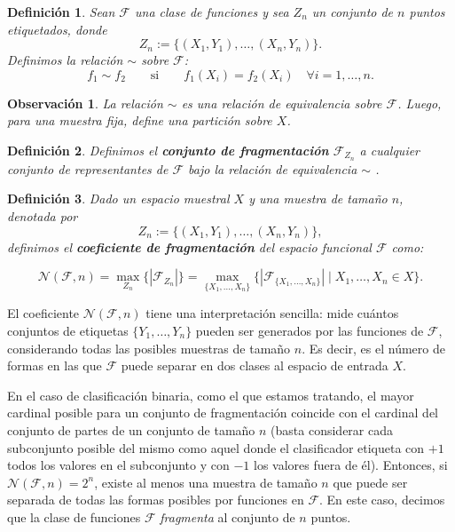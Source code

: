 \documentclass{report}
\newtheorem{dfn}{Definición}[section]
\newtheorem{obs}{Observación}[section]
\begin{document}
\begin{dfn}
    Sean \(\mathcal{F}\) una clase de funciones y sea \(Z_n\) un conjunto de \(n\) puntos etiquetados, donde
    \[
    Z_n := \{(X_1, Y_1), \dots, (X_n, Y_n)\}.
    \]
    Definimos la relación \(\sim\) sobre \(\mathcal{F}\):
    \[
    f_1 \sim f_2 \qquad \text{si} \qquad f_1(X_i) = f_2(X_i) \quad \forall i = 1, \dots, n.
    \]
\end{dfn}
\begin{obs}
    La relación \(\sim\) es una relación de equivalencia sobre \(\mathcal{F}\). Luego, para una muestra fija,
    define una partición sobre $X$.
\end{obs}
\begin{dfn}
    Definimos el \textbf{conjunto de fragmentación} \(\mathcal{F}_{Z_n}\) a cualquier conjunto de representantes de \(\mathcal{F}\)
    bajo la relación de equivalencia \(\sim\) .
\end{dfn}
\begin{dfn}
    Dado un espacio muestral \(X\) y una muestra de tamaño \(n\), denotada por
    \[
    Z_n := \{(X_1, Y_1), \dots, (X_n, Y_n)\},
    \]
    definimos el
    \textbf{coeficiente de fragmentación} del espacio funcional $\mathcal{F}$ como:

    \[
    \mathcal{N}(\mathcal{F}, n) = \max_{Z_n} \{|\mathcal{F}_{Z_n}|\} = \max_{\{X_1, \dots, X_n\}}\{|\mathcal{F}_{\{X_1, \dots, X_n\}}| \mid X_1, \dots, X_n \in X\}.
    \]
\end{dfn}

El coeficiente $\mathcal{N}(\mathcal{F}, n)$ tiene una interpretación sencilla: mide cuántos conjuntos de etiquetas
\( \{Y_1, \dots, Y_n\} \) pueden ser generados por las funciones de \(\mathcal{F}\), considerando todas las posibles
muestras de tamaño \(n\). Es decir, es el número de formas en las que \(\mathcal{F}\) puede separar en dos clases al
espacio de entrada $X$.

En el caso de clasificación binaria, como el que estamos tratando, el mayor cardinal posible para un conjunto de fragmentación
coincide con el cardinal del conjunto de partes de un conjunto de tamaño $n$ (basta considerar cada subconjunto posible del mismo
como aquel donde el clasificador etiqueta con $+1$ todos los valores en el subconjunto y con $-1$ los valores fuera de él). Entonces,
si \(\mathcal{N}(\mathcal{F}, n) = 2^n\), existe al menos una muestra de tamaño \(n\) que puede ser separada
de todas las formas posibles por funciones en \(\mathcal{F}\). En este caso, decimos que la clase de funciones
\(\mathcal{F}\) \textit{fragmenta} al conjunto de \(n\) puntos.
\end{document}
